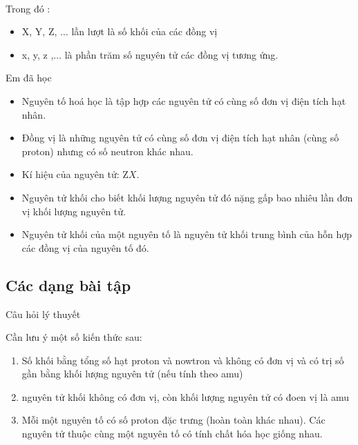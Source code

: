 \\
Trong đó :
\begin{itemize}
	\item X, Y, Z, $\ldots$ lần lượt là số khối của các đồng vị
	\item x, y, z ,$\ldots$ là phần trăm số nguyên tử các đồng vị tương ứng.
\end{itemize}
\begin{tongket}{Em đã học}
	\begin{itemize}
		\item  Nguyên tố hoá học là tập hợp các nguyên tử có cùng số đơn vị điện tích hạt nhân.
		\item  Đồng vị là những nguyên tử có cùng số đơn vị điện tích hạt nhân (cùng số proton) nhưng có số neutron khác nhau.
		\item  Kí hiệu của nguyên tử: $\mathrm{Z} X$.
		\item  Nguyên tử khối cho biết khối lượng nguyên tử đó nặng gấp bao nhiêu lần đơn vị khối lượng nguyên tử.
		\item  Nguyên tử khối của một nguyên tố là nguyên tử khối trung bình của hỗn hợp các đồng vị của nguyên tố đó.
	\end{itemize}
\end{tongket}

\subsection{Các dạng bài tập}
\begin{dang}{Câu hỏi lý thuyết}
	\begin{pp}
		Cần lưu ý một số kiến thức sau:
		\begin{enumerate}
			\item Số khối bằng tổng số hạt proton và nowtron và không có đơn vị và có trị số gần bằng khối lượng nguyên tử (nếu tính theo amu)
			\item nguyên tử khối không có đơn vị, còn khối lượng nguyên tử có đoen vị là amu
			\item Mỗi một nguyên tố có số proton đặc trưng (hoàn toàn khác nhau). Các nguyên tử thuộc cùng một nguyên tố có tính chất hóa học giống nhau.
		\end{enumerate}
	\end{pp}
\end{dang}

